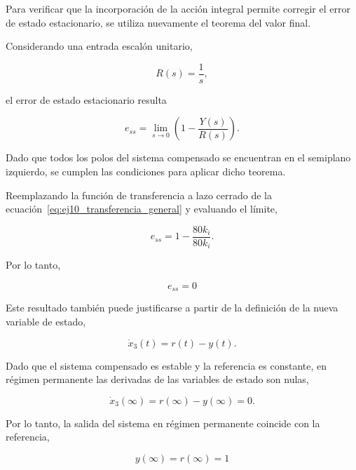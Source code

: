 \documentclass[10pt]{article}
\begin{document}
Para verificar que la incorporación de la acción
integral permite corregir el error de estado
estacionario, se utiliza nuevamente el teorema
del valor final.

Considerando una entrada escalón unitario,

\begin{equation}
    R(s)=\frac{1}{s},
\end{equation}

el error de estado estacionario resulta

\begin{equation}
    e_{ss}=\lim_{s\to0}
    \left(
        1-\frac{Y(s)}{R(s)}
    \right).
\end{equation}

Dado que todos los polos del sistema compensado
se encuentran en el semiplano izquierdo, se cumplen
las condiciones para aplicar dicho teorema.

Reemplazando la función de transferencia a lazo
cerrado de la ecuación~\eqref{eq:ej10_transferencia_general}
y evaluando el límite,

\begin{equation}
    e_{ss}=1-\frac{80k_i}{80k_i}.
\end{equation}

Por lo tanto,

\begin{equation}
    \boxed{e_{ss}=0}
    \label{eq:ej10_error}
\end{equation}

Este resultado también puede justificarse a partir
de la definición de la nueva variable de estado,

\begin{equation}
    \dot{x}_3(t)=r(t)-y(t).
\end{equation}

Dado que el sistema compensado es estable y la referencia
es constante, en régimen permanente las derivadas
de las variables de estado son nulas,

\begin{equation}
    \dot{x}_3(\infty)=
    r(\infty)-y(\infty)=0.
\end{equation}

Por lo tanto, la salida del sistema en régimen
permanente coincide con la referencia,

\begin{equation}
    \boxed{
        y(\infty)=r(\infty)=1
    }
\end{equation}
\end{document}
